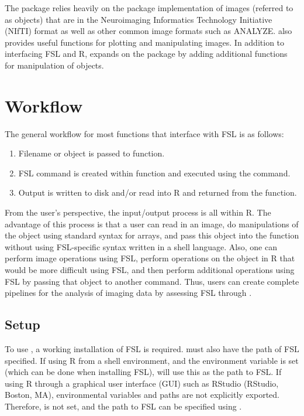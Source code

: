 The  package relies heavily on the  \citep{whitcher_working_2011} package implementation of images (referred to as  objects) that are in the Neuroimaging Informatics Technology Initiative (NIfTI) format as well as other common image formats such as ANALYZE.   also provides useful functions for plotting and manipulating images.  In addition to interfacing FSL and R,  expands on the  package by adding additional functions for manipulation of  objects.


\section{ Workflow}
The general workflow for most  functions that interface with FSL is as follows:
\begin{enumerate}
\item Filename or  object is passed to  function.
\item FSL command is created within  function and executed using the  command.
\item Output is written to disk and/or read into R and returned from the function.
\end{enumerate}

From the user's perspective, the input/output process is all within R.  The advantage of this process is that a user can read in an image, do manipulations of the  object using standard syntax for arrays, and pass this object into the  function without using FSL-specific syntax written in a shell language.  Also, one can perform image operations using FSL, perform operations on the  object in R that would be more difficult using FSL, and then perform additional operations using FSL by passing that object to another  command.  Thus, users can create complete pipelines for the analysis of imaging data by assessing FSL through . 

\subsection{ Setup}
To use , a working installation of FSL is required.   must also have the path of FSL specified.  If using R from a shell environment, and the  environment variable is set (which can be done when installing FSL),  will use this as the path to FSL.  If using R through a graphical user interface (GUI) such as RStudio (RStudio, Boston, MA), environmental variables and paths are not explicitly exported.  Therefore,  is not set, and the path to FSL can be specified using . 


